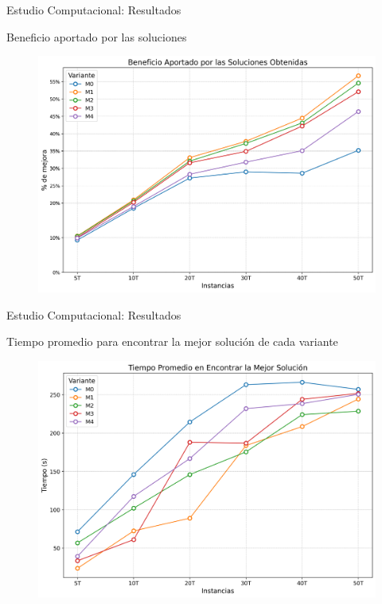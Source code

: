 \documentclass[handout]{beamer}
\begin{document}
\begin{frame}{Estudio Computacional: Resultados}
    \begin{exampleblock}{Beneficio aportado por las soluciones}
        \begin{figure}
            \centering
            \includegraphics[width=0.8\linewidth]{pic/exp-valor-aportado.png}
            \label{fig:valor-aportado}
        \end{figure}
    \end{exampleblock}
\end{frame}

\begin{frame}{Estudio Computacional: Resultados}
    \begin{exampleblock}{Tiempo promedio para encontrar la mejor solución de cada variante}
        \begin{figure}
            \centering
            \includegraphics[width=0.8\linewidth]{pic/exp-tiempo-mejor-solucion.png}
            \label{fig:tiempo-mejor-solucion}
        \end{figure}
    \end{exampleblock}
\end{frame}
\end{document}
